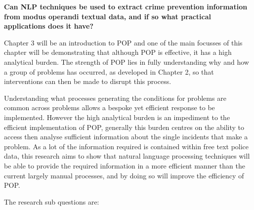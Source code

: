 \textbf{Can NLP techniques be used to extract crime prevention information from modus operandi textual data, and if so what practical applications does it have?}

Chapter 3 will be an introduction to POP and one of the main focusses of this chapter will be demonstrating that although POP is effective, it has a high analytical burden. The strength of POP lies in fully understanding why and how a group of problems has occurred, as developed in Chapter 2, so that interventions can then be made to disrupt this process. 

Understanding what processes generating the conditions for problems are common across problems allows a bespoke yet efficient response to be implemented. However the high analytical burden is an impediment to the efficient implementation of POP, generally this burden centres on the ability to access then analyse sufficient information about the single incidents that make a problem. As a lot of the information required is contained within free text police data, this research aims to show that natural language processing techniques will be able to provide the required information in a more efficient manner than the current largely manual processes, and by doing so will improve the efficiency of POP.

The research sub questions are:

